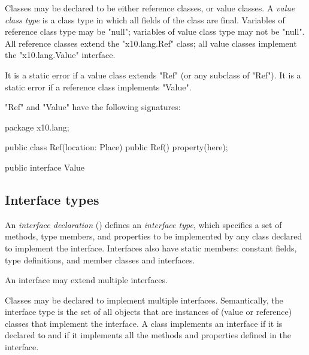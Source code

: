         Classes may be declared to be either reference classes,
        or value classes.
A \emph{value class type}
is a class type in which all fields of the class are final.
%
Variables of reference class type may be \xcd"null"; 
variables of value class type may not be \xcd"null".
%
        All reference classes extend the
        \xcd"x10.lang.Ref" class; all value classes
        implement the \xcd"x10.lang.Value" interface.

        It is a static error if a value class extends
        \xcd"Ref" (or any subclass of \xcd"Ref").
        It is a static error if a reference class implements
        \xcd"Value".

\xcd"Ref" and \xcd"Value" have the following signatures:

\begin{xten}
package x10.lang;

public class Ref(location: Place) {
    public Ref() { property(here); }
}

public interface Value { }
\end{xten}



\subsection{Interface types}
\label{InterfaceTypes}


        An {\em interface declaration} ()
        defines an {\em interface type}, which specifies a set of
        methods, type members, and properties to be implemented by any class
        declared to implement the interface.  Interfaces also
        have static members: constant fields, type definitions,
        and member classes and interfaces.

        An interface may extend multiple interfaces.

Classes may be declared to implement 
multiple interfaces. 
Semantically, the interface type is the set of all objects that are
instances of (value or reference) classes that implement the
interface. A class implements an interface if it is declared to
and if
it implements all the methods and properties defined in the interface.

